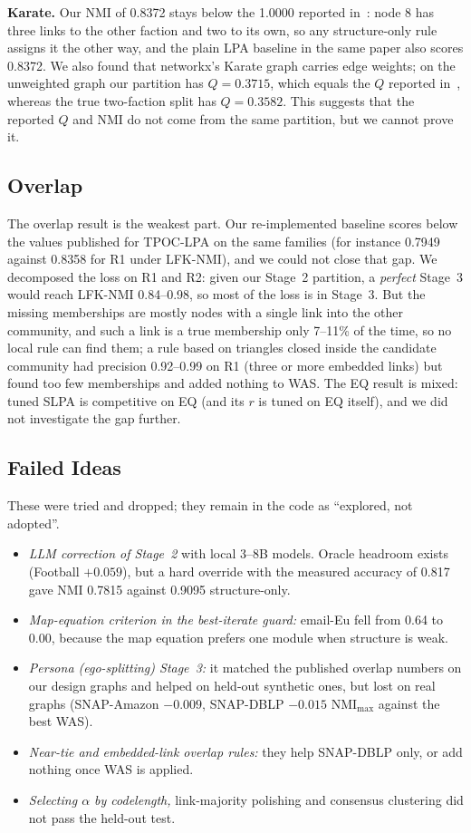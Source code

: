 \documentclass[conference]{IEEEtran}
\begin{document}
\textbf{Karate.} Our NMI of 0.8372 stays below the 1.0000 reported in~\cite{kong2026}: node 8 has three links to the other faction and two to its own, so any structure-only rule assigns it the other way, and the plain LPA baseline in the same paper also scores 0.8372. We also found that networkx's Karate graph carries edge weights; on the unweighted graph our partition has $Q=0.3715$, which equals the $Q$ reported in~\cite{kong2026}, whereas the true two-faction split has $Q=0.3582$. This suggests that the reported $Q$ and NMI do not come from the same partition, but we cannot prove it.

\subsection{Overlap}
The overlap result is the weakest part. Our re-implemented baseline scores below the values published for TPOC-LPA on the same families (for instance 0.7949 against 0.8358 for R1 under LFK-NMI), and we could not close that gap. We decomposed the loss on R1 and R2: given our Stage~2 partition, a \emph{perfect} Stage~3 would reach LFK-NMI 0.84--0.98, so most of the loss is in Stage~3. But the missing memberships are mostly nodes with a single link into the other community, and such a link is a true membership only 7--11\% of the time, so no local rule can find them; a rule based on triangles closed inside the candidate community had precision 0.92--0.99 on R1 (three or more embedded links) but found too few memberships and added nothing to WAS. The EQ result is mixed: tuned SLPA is competitive on EQ (and its $r$ is tuned on EQ itself), and we did not investigate the gap further.

\subsection{Failed Ideas}\label{sec:neg}
These were tried and dropped; they remain in the code as ``explored, not adopted''.
\begin{itemize}
\item \emph{LLM correction of Stage~2} with local 3--8B models. Oracle headroom exists (Football $+0.059$), but a hard override with the measured accuracy of 0.817 gave NMI 0.7815 against 0.9095 structure-only.
\item \emph{Map-equation criterion in the best-iterate guard:} email-Eu fell from 0.64 to 0.00, because the map equation prefers one module when structure is weak.
\item \emph{Persona (ego-splitting) Stage~3:} it matched the published overlap numbers on our design graphs and helped on held-out synthetic ones, but lost on real graphs (SNAP-Amazon $-0.009$, SNAP-DBLP $-0.015$ $\mathrm{NMI}_{\max}$ against the best WAS).
\item \emph{Near-tie and embedded-link overlap rules:} they help SNAP-DBLP only, or add nothing once WAS is applied.
\item \emph{Selecting $\alpha$ by codelength,} link-majority polishing and consensus clustering did not pass the held-out test.
\end{itemize}
\end{document}
